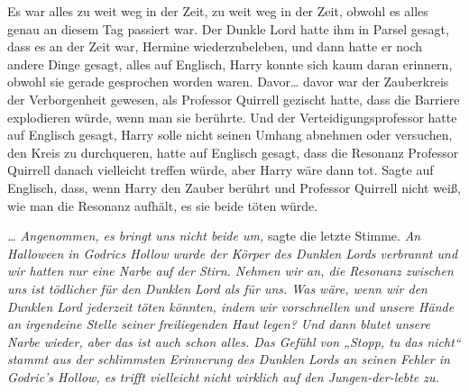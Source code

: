 Es war alles zu weit weg in der Zeit, zu weit weg in der Zeit, obwohl es alles genau an diesem Tag passiert war. Der Dunkle Lord hatte ihm in Parsel gesagt, dass es an der Zeit war, Hermine wiederzubeleben, und dann hatte er noch andere Dinge gesagt, alles auf Englisch, Harry konnte sich kaum daran erinnern, obwohl sie gerade gesprochen worden waren. Davor… davor war der Zauberkreis der Verborgenheit gewesen, als Professor Quirrell gezischt hatte, dass die Barriere explodieren würde, wenn man sie berührte. Und der Verteidigungsprofessor hatte auf Englisch gesagt, Harry solle nicht seinen Umhang abnehmen oder versuchen, den Kreis zu durchqueren, hatte auf Englisch gesagt, dass die Resonanz Professor Quirrell danach vielleicht treffen würde, aber Harry wäre dann tot. Sagte auf Englisch, dass, wenn Harry den Zauber berührt und Professor Quirrell nicht weiß, wie man die Resonanz aufhält, es sie beide töten würde.

\emph{… Angenommen, es bringt uns nicht beide um,} sagte die letzte Stimme. \emph{An Halloween in Godrics Hollow wurde der Körper des Dunklen Lords verbrannt und wir hatten nur eine Narbe auf der Stirn. Nehmen wir an, die Resonanz zwischen uns ist tödlicher für den Dunklen Lord als für uns. Was wäre, wenn wir den Dunklen Lord jederzeit töten könnten, indem wir vorschnellen und unsere Hände an irgendeine Stelle seiner freiliegenden Haut legen? Und dann blutet unsere Narbe wieder, aber das ist auch schon alles. Das Gefühl von „Stopp, tu das nicht“ stammt aus der schlimmsten Erinnerung des Dunklen Lords an seinen Fehler in Godric's Hollow, es trifft vielleicht nicht wirklich auf den Jungen-der-lebte zu.}

